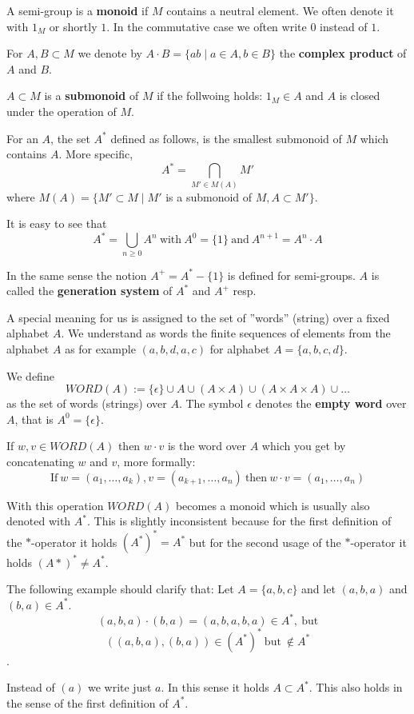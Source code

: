 A semi-group is a {\bf monoid} if $M$ contains a neutral element. We often
denote it with $1_M$ or shortly $1$. In the commutative case we often write $0$
instead of $1$.

For $A,B \subset M$ we denote by $A \cdot B = \{ a b \mid a \in A, b \in B \}$
the {\bf complex product} of $A$ and $B$.

$A \subset M$ is a {\bf submonoid} of $M$ if the follwoing holds: $1_M \in A$
and $A$ is closed under the operation of $M$.

For an $A$, the set $A^*$ defined as follows, is the smallest submonoid of $M$
which contains $A$. More specific,
\[
		A^* = \bigcap_{M' \in M(A)} M'	
\]
where $M(A) = \{ M' \subset M \mid M'$ is a submonoid of $M, A \subset M' \}$.

It is easy to see that
\[
		A^* = \bigcup_{n \geq 0} A^n\ \mbox{with}\ A^0 = \{1\}\ \mbox{and}\ A^{n+1} =
		A^n \cdot A
\]

In the same sense the notion $A^+ = A^* - \{1\}$ is defined for semi-groups. $A$
is called the {\bf generation system} of $A^*$ and $A^+$ resp.

A special meaning for us is assigned to the set of ''words'' (string) over a
fixed alphabet $A$. We understand as words the finite sequences of elements from
the alphabet $A$ as for example $(a,b,d,a,c)$ for alphabet $A = \{ a,b,c,d \}$.

We define
\[
WORD(A) := \{\epsilon\} \cup A \cup (A \times A) \cup (A \times A \times A) \cup
\ldots
\]
as the set of words (strings) over $A$. The symbol $\epsilon$ denotes the {\bf
empty word} over $A$, that is $A^0 = \{\epsilon\}$.

If $w, v \in WORD(A)$ then $w \cdot v$ is the word over $A$ which you get by
concatenating $w$ and $v$, more formally:
\[
\mbox{If}\ w = (a_1,\ldots,a_k), v = (a_{k+1},\ldots,a_n)\ \mbox{then}\ w \cdot
v = (a_1, \ldots, a_n)
\]

With this operation $WORD(A)$ becomes a monoid which is usually also denoted
with $A^*$. This is slightly inconsistent because for the first definition of
the $*$-operator it holds $(A^*)^* = A^*$ but for the second usage of the
$*$-operator it holds $(A*)^* \neq A^*$.

The following example should clarify that: Let $A = \{a,b,c\}$ and let $(a,b,a)$
and $(b,a) \in A^*$.
\[(a,b,a)\cdot(b,a) = (a,b,a,b,a) \in A^*,\ \mbox{but}\]
\[((a,b,a),(b,a)) \in (A^*)^*\ \mbox{but}\ \notin A^*\].


Instead of $(a)$ we write just $a$. In this sense it holds $A \subset A^*$. This
also holds in the sense of the first definition of $A^*$.

